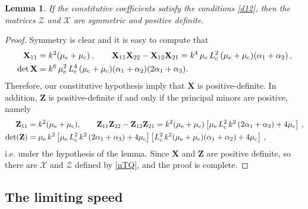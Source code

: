 \documentclass[10pt]{article}
\newtheorem{lemma}[theorem]{Lemma}
\begin{document}
 
 
 \begin{lemma}If  the constitutive coefficients satisfy the conditions 	\eqref{d12},
 then the	 matrices $\boldsymbol{\mathcal{Z}}$ and $\boldsymbol{\mathcal{X}}$ are symmetric and positive definite.	
 \end{lemma}
 \begin{proof}
 	Symmetry is clear and it is easy to compute that	\begin{align}
 	{\mathbf{X}}_{11}&= k^2(\mu_{\rm e} +\mu_{\rm c}) \,,\qquad 
 	{\mathbf{X}}_{11}{\mathbf{X}}_{22}-{\mathbf{X}}_{12}{\mathbf{X}}_{21}=k^4\,\mu_{\rm e}\,L_{\rm c}^2\,( \mu_{\rm e} +\mu_{\rm c} )(\alpha_1+\alpha_2)\,,\\ 
 	\det {{\mathbf{X}}}&=k^6\,\mu_{\rm e}^2\,L_{\rm c}^4\,( \mu_{\rm e} +\mu_{\rm c} )(\alpha_1+\alpha_2)(2\alpha_1+\alpha_3).\notag
 	\end{align}
 	Therefore, our constitutive  hypothesis imply that ${\mathbf{X}}$ is positive-definite. In addition,  ${\mathbf{Z}}$ is positive-definite if and only if the principal minors are positive, namely
 	\begin{align}
 	{\mathbf{Z}}_{11}&=k^2(\mu_{\rm e} +\mu_{\rm c}),\qquad
 	{\mathbf{Z}}_{11}{\mathbf{Z}}_{22}-{\mathbf{Z}}_{12}{\mathbf{Z}}_{21}=k^2(\mu_{\rm e} +\mu_{\rm c})\left[{\mu_{\rm e}\,L_{\rm c}^2}\,k^2\,(2\alpha_1+\alpha_3)+4 \mu_{\rm c}\right]\,,\\
 	\det({\mathbf{Z}})&=\mu_{\rm e}\,k^2\left[\mu_{\rm e}\,L_{\rm c}^2\,k^2\,(2\alpha_1+\alpha_3)+4 \mu_{\rm c}\right]\left[L_{\rm c}^2\,k^2(\mu_{\rm e} +\mu_{\rm c})(\alpha_1+\alpha_2)+4 \mu_{\rm c}\right]\,,\notag
 	\end{align}
 i.e. under the hypothesis of the lemma. 
 Since $\mathbf{X}$ and $\mathbf{Z}$ are positive definite, so there are $\boldsymbol{\mathcal{X}}$ and $\boldsymbol{\mathcal{Z}}$ defined by \eqref{nTQ}, and the proof is complete.
 \end{proof}
 \subsection{The limiting speed}
\end{document}

